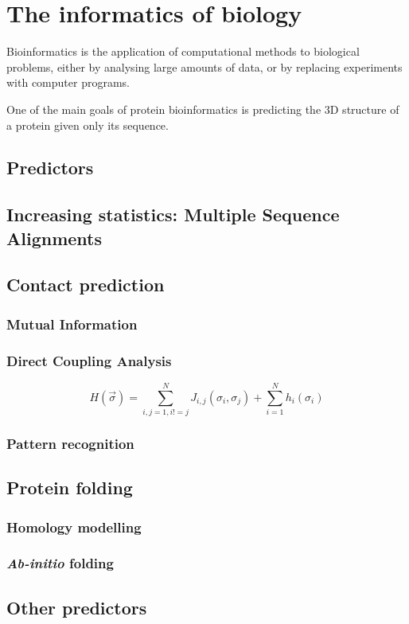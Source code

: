 \chapter{The informatics of biology}
Bioinformatics is the application of computational methods to biological problems,
either by analysing large amounts of data, or by replacing experiments with computer programs.

One of the main goals of protein bioinformatics is predicting the 3D structure of a protein given only its sequence.

\section{Predictors}

\section[Multiple Sequence Alignments]{Increasing statistics: Multiple Sequence Alignments}

\section{Contact prediction}


\subsection{Mutual Information}

\subsection{Direct Coupling Analysis}

\begin{equation*}
H(\vec \sigma) = \sum_{i,j=1, i!=j}^N J_{i, j}(\sigma_i, \sigma_j) + \sum_{i=1}^N h_i(\sigma_i)
\end{equation*}

\subsection{Pattern recognition}

\section{Protein folding}


\subsection{Homology modelling}
\subsection{\emph{Ab-initio} folding}

\section{Other predictors}

